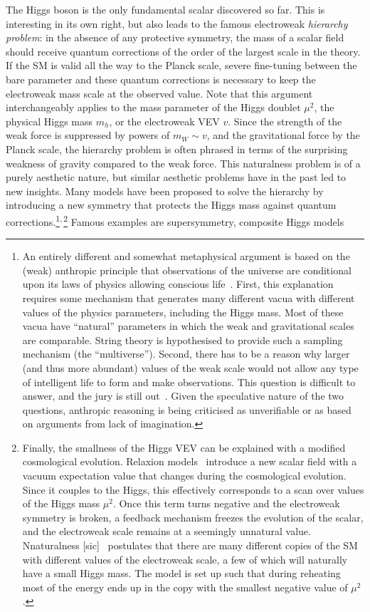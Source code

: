 The Higgs boson is the only fundamental scalar discovered so far. This
is interesting in its own right, but also leads to the famous
electroweak \emph{hierarchy problem}: in the absence of any protective
symmetry, the mass of a scalar field should receive quantum
corrections of the order of the largest scale in the theory. If the SM
is valid all the way to the Planck scale, severe fine-tuning between
the bare parameter and these quantum corrections is necessary to keep
the electroweak mass scale at the observed value. Note that this
argument interchangeably applies to the mass parameter of the Higgs
doublet $\mu^2$, the physical Higgs mass $m_h$, or the electroweak VEV
$v$. Since the strength of the weak force is suppressed by powers of
$m_W \sim v$, and the gravitational force by the Planck scale, the
hierarchy problem is often phrased in terms of the surprising weakness
of gravity compared to the weak force. This naturalness problem is of
a purely aesthetic nature, but similar aesthetic problems have in the
past led to new insights. Many models have been proposed to solve the
hierarchy by introducing a new symmetry that protects the Higgs mass
against quantum corrections.\footnote{An entirely different and
  somewhat metaphysical argument is based on the (weak) anthropic
  principle that observations of the universe are conditional upon its
  laws of physics allowing conscious life~\cite{Weinberg:1987dv,
    Barrow:1988yia}. First, this explanation requires some mechanism
  that generates many different vacua with different values of the
  physics parameters, including the Higgs mass. Most of these vacua
  have ``natural'' parameters in which the weak and gravitational
  scales are comparable. String theory is hypothesised to provide such
  a sampling mechanism (the ``multiverse''). Second, there has to be a
  reason why larger (and thus more abundant) values of the weak scale
  would not allow any type of intelligent life to form and make
  observations. This question is difficult to answer, and the jury is
  still out~\cite{Agrawal:1997gf, Harnik:2006vj, Clavelli:2006di,
    Giudice:2008bi, Donoghue:2009me, Gedalia:2010iy,
    Adams:2015hvd}. Given the speculative nature of the two questions,
  anthropic reasoning is being criticised as unverifiable or as based
  on arguments from lack of
  imagination.}\textsuperscript{,\,}\footnote{Finally, the smallness
  of the Higgs VEV can be explained with a modified cosmological
  evolution. Relaxion models~\cite{Graham:2015cka} introduce a new
  scalar field with a vacuum expectation value that changes during the
  cosmological evolution. Since it couples to the Higgs, this
  effectively corresponds to a scan over values of the Higgs mass
  $\mu^2$. Once this term turns negative and the electroweak symmetry
  is broken, a feedback mechanism freezes the evolution of the scalar,
  and the electroweak scale remains at a seemingly unnatural
  value. Nnaturalness [sic]~\cite{Arkani-Hamed:2016rle} postulates
  that there are many different copies of the SM with different values
  of the electroweak scale, a few of which will naturally have a small
  Higgs mass. The model is set up such that during reheating most of
  the energy ends up in the copy with the smallest negative value of
  $\mu^2$.} Famous examples are supersymmetry, composite Higgs models
